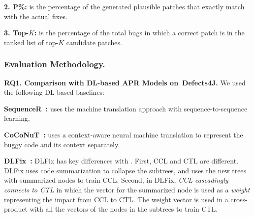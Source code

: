 {\bf 2. P\%:} is the percentage of the generated plausible patches
that exactly match with the actual fixes.

{\bf 3. Top-$K$:} is the percentage of the total bugs in which a correct
patch is in the ranked list of top-$K$ candidate patches.

\subsubsection{Evaluation Methodology.\\}

{\bf RQ1. Comparison with DL-based APR Models on~Defects4J.}  We used
the following DL-based baselines:



{\bf SequenceR~\cite{chen2018sequencer}: } uses the machine
translation approach with sequence-to-sequence learning.

{\bf CoCoNuT~\cite{lutellier2020coconut}:} uses a context-aware neural
machine translation to represent the buggy code and its
context separately.


{\bf DLFix~\cite{icse20}:} DLFix has key differences with {\tool}.
First, CCL and CTL are different. DLFix uses code summarization to
collapse the subtrees, and uses the new trees with summarized nodes to
train CCL. Second, in DLFix, {\em CCL cascadingly connects to CTL} in
which the vector for the summarized node is used as a {\em weight}
representing the impact from CCL to CTL. The weight vector is used in
a cross-product with all the vectors of the nodes in the subtrees to
train CTL.



